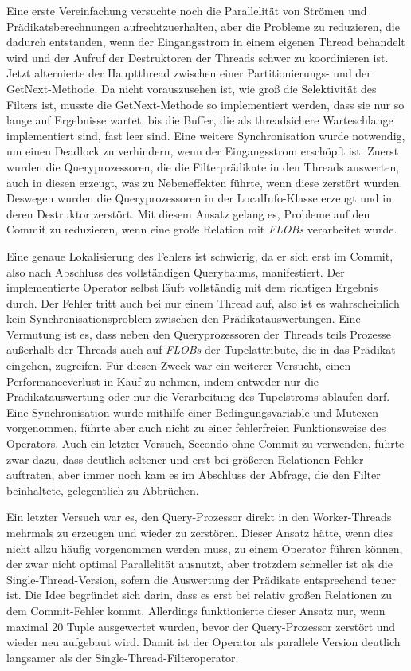 \documentclass[a4paper,12pt,twoside]{article}
\newcommand{\Fb}[1]{\textit{#1}} %
\begin{document}
Eine erste Vereinfachung versuchte noch die Parallelität von Strömen und Prädikatsberechnungen aufrechtzuerhalten, aber die Probleme zu reduzieren, die dadurch entstanden, wenn der Eingangsstrom in einem eigenen Thread behandelt wird und der Aufruf der Destruktoren der Threads schwer zu koordinieren ist. Jetzt alternierte der Hauptthread zwischen einer Partitionierungs- und der GetNext-Methode. Da nicht vorauszusehen ist, wie groß die Selektivität des Filters ist, musste die GetNext-Methode so implementiert werden, dass sie nur so lange auf Ergebnisse wartet, bis die Buffer, die als threadsichere Warteschlange implementiert sind, fast leer sind. Eine weitere Synchronisation wurde notwendig, um einen Deadlock zu verhindern, wenn der Eingangsstrom erschöpft ist. Zuerst wurden die Queryprozessoren, die die Filterprädikate in den Threads auswerten, auch in diesen erzeugt, was zu Nebeneffekten führte, wenn diese zerstört wurden. Deswegen wurden die Queryprozessoren in der LocalInfo-Klasse erzeugt und in deren Destruktor zerstört. Mit diesem Ansatz gelang es, Probleme auf den Commit zu reduzieren, wenn eine große Relation mit \Fb{FLOBs} verarbeitet wurde.

Eine genaue Lokalisierung des Fehlers ist schwierig, da er sich erst im Commit, also nach Abschluss des vollständigen Querybaums, manifestiert. Der implementierte Operator selbst läuft vollständig mit dem richtigen Ergebnis durch. Der Fehler tritt auch bei nur einem Thread auf, also ist es wahrscheinlich kein Synchronisationsproblem zwischen den Prädikatauswertungen. Eine Vermutung ist es, dass neben den Queryprozessoren der Threads teils Prozesse außerhalb der Threads auch auf \Fb{FLOBs} der Tupelattribute, die in das Prädikat eingehen, zugreifen. Für diesen Zweck war ein weiterer Versucht, einen Performanceverlust in Kauf zu nehmen, indem entweder nur die Prädikatauswertung oder nur die Verarbeitung des Tupelstroms ablaufen darf. Eine Synchronisation wurde mithilfe einer Bedingungsvariable und Mutexen vorgenommen, führte aber auch nicht zu einer fehlerfreien Funktionsweise des Operators. Auch ein letzter Versuch, Secondo ohne Commit zu verwenden, führte zwar dazu, dass deutlich seltener und erst bei größeren Relationen Fehler auftraten, aber immer noch kam es im Abschluss der Abfrage, die den Filter beinhaltete, gelegentlich zu Abbrüchen.

Ein letzter Versuch war es, den Query-Prozessor direkt in den Worker-Threads mehrmals zu erzeugen und wieder zu zerstören. Dieser Ansatz hätte, wenn dies nicht allzu häufig vorgenommen werden muss, zu einem Operator führen können, der zwar nicht optimal Parallelität ausnutzt, aber trotzdem schneller ist als die Single-Thread-Version, sofern die Auswertung der Prädikate entsprechend teuer ist. Die Idee begründet sich darin, dass es erst bei relativ großen Relationen zu dem Commit-Fehler kommt. Allerdings funktionierte dieser Ansatz nur, wenn maximal 20 Tuple ausgewertet wurden, bevor der Query-Prozessor zerstört und wieder neu aufgebaut wird. Damit ist der Operator als parallele Version deutlich langsamer als der Single-Thread-Filteroperator. 
\end{document}
